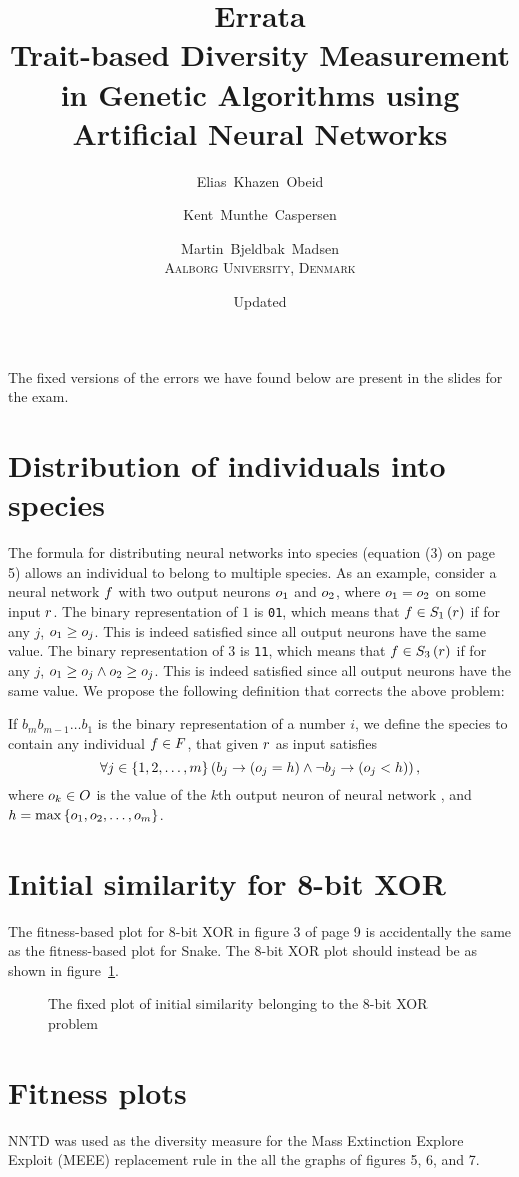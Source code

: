 \documentclass{memoir}
\title{Errata\\
\Large Trait-based Diversity Measurement in Genetic Algorithms using Artificial Neural Networks}
\author{Elias~Khazen~Obeid \and
        Kent~Munthe~Caspersen \and
        Martin~Bjeldbak~Madsen\\
    \scshape Aalborg University, Denmark}
\date{Updated \formatdate{22}{6}{2014}}
\begin{document}
\pagestyle{empty}
\maketitle
\thispagestyle{empty}


The fixed versions of the errors we have found below are present in the slides for the exam.

\section*{Distribution of individuals into species}
The formula for distributing neural networks into species (equation (3) on page 5) allows an individual to belong to multiple species.
As an example, consider a neural network $f$ with two output neurons $o_1$ and $o_2$, where $o_1 = o_2$ on some input $r$.
The binary representation of $1$ is \texttt{01}, which means that $f \in S_{1}\left(r\right)$ if for any $j$, $o_1 \geq o_j$. This is indeed satisfied since all output neurons have the same value.
The binary representation of $3$ is \texttt{11}, which means that $f \in S_{3}\left(r\right)$ if for any $j$, $o_1 \geq o_j \wedge o_2 \geq o_j$. This is indeed satisfied since all output neurons have the same value. We propose the following definition that corrects the above problem:

If $b_{m}b_{m-1}\dots b_1$ is the binary representation of a number $i$, we define the species  to contain any individual $f \in F$, that given $r$ as input satisfies
\begin{equation*}
  \forall j \in \left\{1, 2,\dots,m\right\}\left(b_j \rightarrow \left(o_j = h\right) \land \neg b_j \rightarrow \left(o_j < h\right)\right),
\end{equation*}
where $o_k \in O$ is the value of the $k$th output neuron of neural network \ind, and $h = \max\left\{o_1, o_2, \dots, o_m\right\}$.

\section*{Initial similarity for 8-bit XOR}
The fitness-based plot for 8-bit XOR in figure 3 of page 9 is accidentally the same as the fitness-based plot for Snake. 
The 8-bit XOR plot should instead be as shown in figure~\ref{fig:initial-similarity-xor}.

\begin{figure}[htbp]
  \centering
  \resizebox{0.5\linewidth}{!}{%
  
}
  \caption{The fixed plot of initial similarity belonging to the 8-bit XOR problem}\label{fig:initial-similarity-xor}
\end{figure}

\section*{Fitness plots}
NNTD was used as the diversity measure for the Mass Extinction Explore Exploit (MEEE) replacement rule in the all the graphs of figures 5, 6, and 7.
\end{document}
